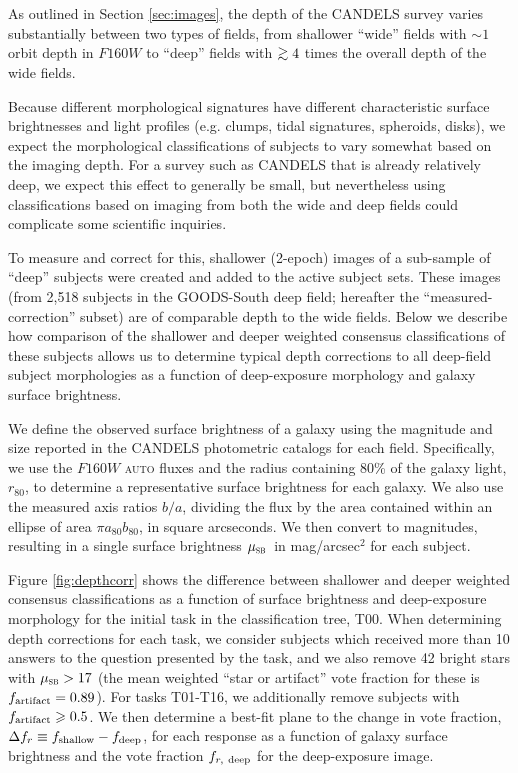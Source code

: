 \documentclass[useAMS,usenatbib]{mn2e}
\def\musb       {$\mu_{\rm{\textsc{sb}}}$}
\def\mmusb     {\mu_{\rm{\textsc{sb}}}}
\def\gtrsim{\mathrel{\hbox{\rlap{\hbox{\lower3pt\hbox{$\sim$}}}\hbox{\raise2pt\hbox{$>$}}}}}
\begin{document}
{As outlined in Section \ref{sec:images}, the depth of the CANDELS survey varies substantially between two types of fields, from shallower ``wide'' fields with $\sim 1$ orbit depth in $F160W$ to ``deep'' fields with $\gtrsim 4$ times the overall depth of the wide fields. 

Because different morphological signatures have different characteristic surface brightnesses and light profiles (e.g. clumps, tidal signatures, spheroids, disks), we expect the morphological classifications of subjects to vary somewhat based on the imaging depth. For a survey such as CANDELS that is already relatively deep, we expect this effect to generally be small, but nevertheless using classifications based on imaging from both the wide and deep fields could complicate some scientific inquiries.

To measure and correct for this, shallower (2-epoch) images of a sub-sample of ``deep'' subjects were created and added to the active subject sets. These images (from 2,518 subjects in the GOODS-South deep field; hereafter the ``measured-correction'' subset) are of comparable depth to the wide fields. Below we describe how comparison of the shallower and deeper weighted consensus classifications of these subjects allows us to determine typical depth corrections to all deep-field subject morphologies as a function of deep-exposure morphology and galaxy surface brightness.

We define the observed surface brightness of a galaxy using the magnitude and size reported in the CANDELS photometric catalogs for each field. Specifically, we use the $F160W$ \textsc{auto} fluxes and the radius containing 80\% of the galaxy light, $r_{80}$, to determine a representative surface brightness for each galaxy. We also use the measured axis ratios $b/a$, dividing the flux by the area contained within an ellipse of area $\pi a_{80} b_{80}$, in square arcseconds. We then convert to magnitudes, resulting in a single surface brightness \musb\ in mag/arcsec$^2$ for each subject.

Figure \ref{fig:depthcorr} shows the difference between shallower and deeper weighted consensus classifications as a function of surface brightness and deep-exposure morphology for the initial task in the classification tree, T00. When determining depth corrections for each task, we consider subjects which received more than 10 answers to the question presented by the task, and we also remove 42 bright stars with $\mmusb > 17$ (the mean weighted ``star or artifact'' vote fraction for these is $f_{\rm artifact} = 0.89$). For tasks T01-T16, we additionally remove subjects with $f_{\rm artifact} \geq 0.5$. We then determine a best-fit plane to the change in vote fraction, $\Delta f_r \equiv f_{\rm shallow} - f_{\rm deep}$, for each response as a function of galaxy surface brightness and the vote fraction $f_{r, \rm\ deep}$ for the deep-exposure image. 

}
\end{document}
